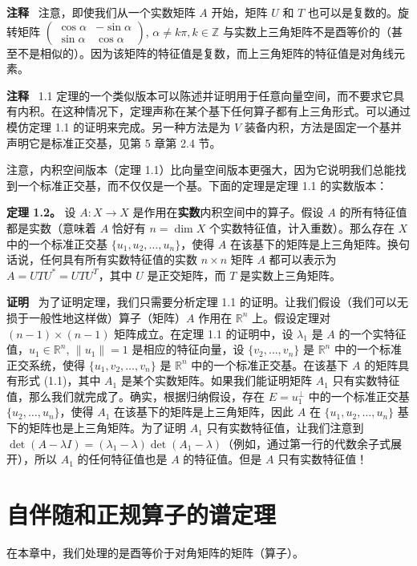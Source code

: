 \textbf{注释} ~注意，即使我们从一个实数矩阵 $A$ 开始，矩阵 $U$ 和 $T$ 也可以是复数的。旋转矩阵 $\begin{pmatrix} \cos \alpha & -\sin \alpha \\ \sin \alpha & \cos \alpha \end{pmatrix}$, $\alpha \neq k\pi, k \in \mathbb{Z}$ 与实数上三角矩阵不是酉等价的（甚至不是相似的）。因为该矩阵的特征值是复数，而上三角矩阵的特征值是对角线元素。

\textbf{注释} ~1.1 定理的一个类似版本可以陈述并证明用于任意向量空间，而不要求它具有内积。在这种情况下，定理声称在某个基下任何算子都有上三角形式。可以通过模仿定理 1.1 的证明来完成。另一种方法是为 $V$ 装备内积，方法是固定一个基并声明它是标准正交基，见第 5 章第 2.4 节。


注意，内积空间版本（定理 1.1）比向量空间版本更强大，因为它说明我们总能找到一个标准正交基，而不仅仅是一个基。下面的定理是定理 1.1 的实数版本：

\textbf{定理 1.2。} 设 $A: X \to X$ 是作用在\textbf{实数}内积空间中的算子。假设 $A$ 的所有特征值都是实数（意味着 $A$ 恰好有 $n = \dim X$ 个实数特征值，计入重数）。那么存在 $X$ 中的一个标准正交基 $\{u_1, u_2, \dots, u_n\}$，使得 $A$ 在该基下的矩阵是上三角矩阵。换句话说，任何具有所有实数特征值的实数 $n \times n$ 矩阵 $A$ 都可以表示为 $A = UTU^* = U T U^T$，其中 $U$ 是正交矩阵，而 $T$ 是实数上三角矩阵。

\textbf{证明}~ 为了证明定理，我们只需要分析定理 1.1 的证明。让我们假设（我们可以无损于一般性地这样做）算子（矩阵）$A$ 作用在 $\mathbb{R}^n$ 上。假设定理对 $(n-1) \times (n-1)$ 矩阵成立。在定理 1.1 的证明中，设 $\lambda_1$ 是 $A$ 的一个实特征值，$u_1 \in \mathbb{R}^n$, $\|u_1\| = 1$ 是相应的特征向量，设 $\{v_2, \dots, v_n\}$ 是 $\mathbb{R}^n$ 中的一个标准正交系统，使得 $\{u_1, v_2, \dots, v_n\}$ 是 $\mathbb{R}^n$ 中的一个标准正交基。在该基下 $A$ 的矩阵具有形式 (1.1)，其中 $A_1$ 是某个实数矩阵。如果我们能证明矩阵 $A_1$ 只有实数特征值，那么我们就完成了。确实，根据归纳假设，存在 $E = u_1^\perp$ 中的一个标准正交基 $\{u_2, \dots, u_n\}$，使得 $A_1$ 在该基下的矩阵是上三角矩阵，因此 $A$ 在 $\{u_1, u_2, \dots, u_n\}$ 基下的矩阵也是上三角矩阵。为了证明 $A_1$ 只有实数特征值，让我们注意到 $\det(A - \lambda I) = ( \lambda_1 - \lambda ) \det( A_1 - \lambda )$（例如，通过第一行的代数余子式展开），所以 $A_1$ 的任何特征值也是 $A$ 的特征值。但是 $A$ 只有实数特征值！

\section{自伴随和正规算子的谱定理}
在本章中，我们处理的是酉等价于对角矩阵的矩阵（算子）。

